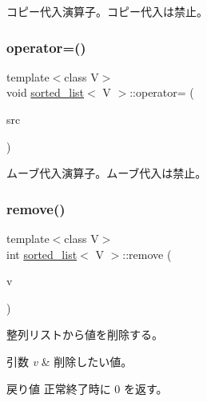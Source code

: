コピー代入演算子。コピー代入は禁止。 \hypertarget{classsorted__list_a813a43cf983820ca859a959ab739da16}{}\label{classsorted__list_a813a43cf983820ca859a959ab739da16} 
\subsubsection{\texorpdfstring{operator=()}{operator=()}\hspace{0.1cm}{\footnotesize\ttfamily [2/2]}}
{\footnotesize\ttfamily template$<$class V$>$ \\
void \hyperlink{classsorted__list}{sorted\+\_\+list}$<$ V $>$\+::operator= (\begin{DoxyParamCaption}\item[{const \hyperlink{classsorted__list}{sorted\+\_\+list}$<$ V $>$ \&\&}]{src }\end{DoxyParamCaption})\hspace{0.3cm}{\ttfamily [delete]}}

ムーブ代入演算子。ムーブ代入は禁止。 \hypertarget{classsorted__list_adeade10cead68bad83d1eae1a9c841aa}{}\label{classsorted__list_adeade10cead68bad83d1eae1a9c841aa} 
\subsubsection{\texorpdfstring{remove()}{remove()}}
{\footnotesize\ttfamily template$<$class V$>$ \\
int \hyperlink{classsorted__list}{sorted\+\_\+list}$<$ V $>$\+::remove (\begin{DoxyParamCaption}\item[{V \&}]{v }\end{DoxyParamCaption})}

整列リストから値を削除する。 
\begin{DoxyParams}{引数}
{\em v} & 削除したい値。 \\
\hline
\end{DoxyParams}
\begin{DoxyReturn}{戻り値}
正常終了時に 0 を返す。 
\end{DoxyReturn}
\hypertarget{classsorted__list_a24c602fa9554ff65d4912d00ced7805b}{}\label{classsorted__list_a24c602fa9554ff65d4912d00ced7805b} 

